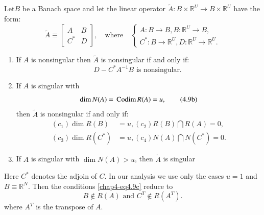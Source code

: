 \setcounter{chaplemma}{8}
\begin{chaplemma}\label{chap4-lem4.9} %
Let\pageoriginale $B$ be a Banach space and let the linear operator
  $\tilde{A}: B \times \mathbb{R}^U \to B \times \mathbb{R}^U$ have
  the form: 
\begin{equation*}
\tilde{A} \equiv  
\begin{bmatrix}
A  & B \\ C^*  & D
\end{bmatrix},
\quad\text{where}\quad
\begin{cases}
A : B \to B, B : \mathbb{R}^U \to B, \\ 
C^* : B \to \mathbb{R}^U, D: \mathbb{R}^U \to \mathbb{R}^U.
\end{cases}
\end{equation*}   
\begin{enumerate}[\rm(i)]
\item If $A$ is nonsingular  then $\tilde{A}$ is nonsingular
  if and only if: 
\begin{equation*}
D - C^* A^{-1}B \text{ is nonsingular. } \tag{4.9a}\label{chap4-eq4.9a}
\end{equation*}

\item If $A$ is singular with
\begin{equation*}
\dim N(A)= \text{\rm\,Codim\,} R(A)=u, \tag{4.9b}\label{chap4-eq4.9b}
\end{equation*}
then $\tilde{A}$ is nonsingular if and only if:
\begin{equation*}
\begin{split}
(c_1) \dim R (B)& = u,  (c_2)R(B)\bigcap R(A)=0,\\
(c_3)\dim R (C^*)& = u, (c_4)N(A) \bigcap N(C^*) = 0. 
\end{split}\tag{4.9c}\label{chap4-eq4.9c}
\end{equation*}

\item If $A$ is singular with $\dim N(A) > u$, then
  $\tilde{A}$ is singular 
\end{enumerate} 
\end{chaplemma}

Here $C^*$ denotes the adjoin of $C$. In our analysis we use only the
cases $u = 1$ and $B \equiv \mathbb{R}^N$. Then the conditions
\eqref{chap4-eq4.9c} reduce to  
\begin{equation*}
B \notin R(A) \text{ and } C^T \notin
R(A^T). \tag{4.10}\label{chap4-eq4.10} 
\end{equation*}   
where $A^T$ is the transpose of $A$.

